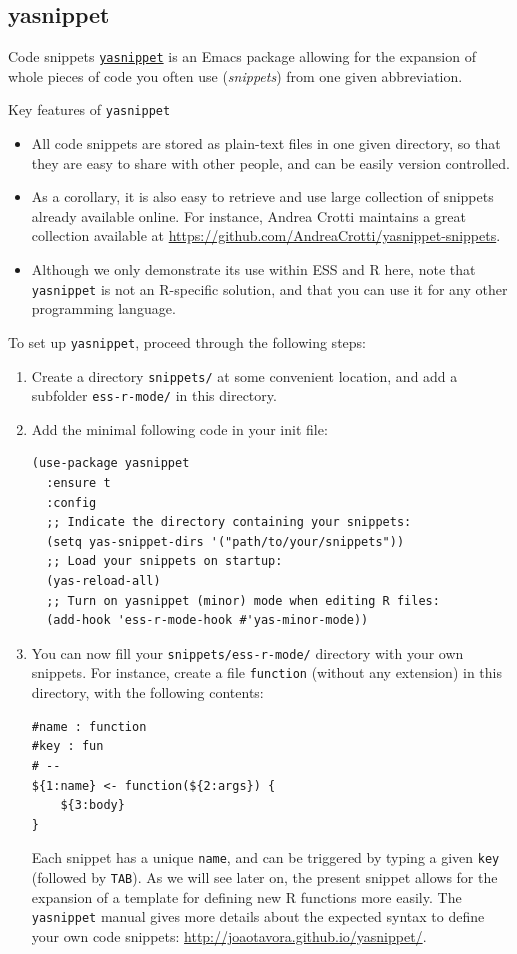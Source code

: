 \documentclass[presentation]{beamer}
\begin{document}
\subsection{yasnippet}
\label{sec:org3585d4c}
\begin{frame}[fragile,allowframebreaks,label=]{Code snippets}
 \href{https://github.com/joaotavora/yasnippet}{\texttt{yasnippet}} is an Emacs package allowing for the expansion of whole pieces of code you often use (\emph{snippets}) from one given abbreviation. 

\begin{block}{Key features of \texttt{yasnippet}}
\begin{itemize}
\item All code snippets are stored as plain-text files in one given directory, so that they are easy to share with other people, and can be easily version controlled.
\item As a corollary, it is also easy to retrieve and use large collection of snippets already available online. For instance, Andrea Crotti maintains a great collection available at \url{https://github.com/AndreaCrotti/yasnippet-snippets}.
\item Although we only demonstrate its use within ESS and R here, note that \texttt{yasnippet} is not an R-specific solution, and that you can use it for any other programming language.
\end{itemize}
\end{block}

To set up \texttt{yasnippet}, proceed through the following steps:

\begin{enumerate}
\item Create a directory \texttt{snippets/} at some convenient location, and add a subfolder \texttt{ess-r-mode/} in this directory.
\item Add the minimal following code in your init file:
\begin{verbatim}
(use-package yasnippet
  :ensure t
  :config
  ;; Indicate the directory containing your snippets:
  (setq yas-snippet-dirs '("path/to/your/snippets"))
  ;; Load your snippets on startup:
  (yas-reload-all)
  ;; Turn on yasnippet (minor) mode when editing R files:
  (add-hook 'ess-r-mode-hook #'yas-minor-mode))
\end{verbatim}
\item You can now fill your \texttt{snippets/ess-r-mode/} directory with your own snippets. For instance, create a file \texttt{function} (without any extension) in this directory, with the following contents:
\begin{verbatim}
#name : function
#key : fun
# --
${1:name} <- function(${2:args}) {
    ${3:body}
}
\end{verbatim}
Each snippet has a unique \texttt{name}, and can be triggered by typing a given \texttt{key} (followed by \texttt{TAB}). As we will see later on, the present snippet allows for the expansion of a template for defining new R functions more easily. The \texttt{yasnippet} manual gives more details about the expected syntax to define your own code snippets: \url{http://joaotavora.github.io/yasnippet/}.


\end{enumerate}
\end{frame}
\end{document}
